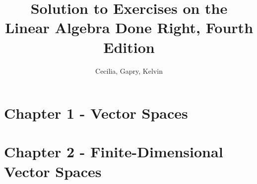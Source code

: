 \documentclass{article}
\title{Solution to Exercises on the \\Linear Algebra Done Right, Fourth Edition}
\author{Cecilia, Gapry, Kelvin}
\begin{document}
\maketitle

\section*{Chapter 1 - Vector Spaces}




\section*{Chapter 2 - Finite-Dimensional Vector Spaces}



\end{document}
